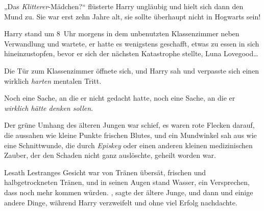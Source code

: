 „Das \emph{Klitterer}-Mädchen?“ flüsterte Harry ungläubig und hielt sich dann den Mund zu. Sie war erst zehn Jahre alt, sie sollte überhaupt nicht in Hogwarts sein!


Harry stand um 8~Uhr morgens in dem unbenutzten Klassenzimmer neben Verwandlung und wartete, er hatte es wenigstens geschafft, etwas zu essen in sich hineinzustopfen, bevor er sich der nächsten Katastrophe stellte, Luna Lovegood…

Die Tür zum Klassenzimmer öffnete sich, und Harry sah und verpasste sich einen wirklich \emph{harten} mentalen Tritt.

Noch eine Sache, an die er nicht gedacht hatte, noch eine Sache, an die er \emph{wirklich hätte denken sollen}.

Der grüne Umhang des älteren Jungen war schief, es waren rote Flecken darauf, die aussahen wie kleine Punkte frischen Blutes, und ein Mundwinkel sah aus wie eine Schnittwunde, die durch \emph{Episkey} oder einen anderen kleinen medizinischen Zauber, der den Schaden nicht ganz auslöschte, geheilt worden war.

Lesath Lestranges Gesicht war von Tränen übersät, frischen und halbgetrockneten Tränen, und in seinen Augen stand Wasser, ein Versprechen, dass noch mehr kommen würden. , sagte der ältere Junge, und dann  und einige andere Dinge, während Harry verzweifelt und ohne viel Erfolg nachdachte.

